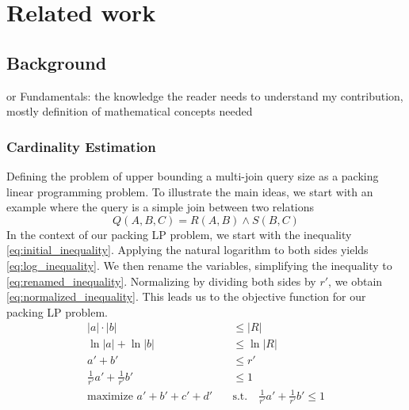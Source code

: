 
\chapter{Related work}\label{chapter:relatedwork}

\section{Background}
or Fundamentals: the knowledge the reader needs to understand my contribution, mostly definition of mathematical concepts needed

\subsection{Cardinality Estimation}
Defining the problem of upper bounding a multi-join query size as a packing linear programming problem.
To illustrate the main ideas, we start with an example where the query is a simple join
between two relations
\[
Q(A, B, C) = R(A, B) \land S(B, C)
\]
In the context of our packing LP problem, we start with the inequality \ref{eq:initial_inequality}. Applying the natural logarithm to both sides yields \ref{eq:log_inequality}. We then rename the variables, simplifying the inequality to \ref{eq:renamed_inequality}. 
Normalizing by dividing both sides by \(r'\), we obtain \ref{eq:normalized_inequality}. This leads us to the objective function for our packing LP problem.
\begin{align}
    |a| \cdot |b| &\leq |R| \label{eq:initial_inequality} \\
    \ln|a| + \ln|b| &\leq \ln|R| \label{eq:log_inequality} \\
    a' + b' &\leq r' \label{eq:renamed_inequality} \\
    \frac{1}{r'} a' + \frac{1}{r'} b' &\leq 1 \label{eq:normalized_inequality} \\
    \text{maximize } a' + b' + c' + d' \quad &\text{s.t.} \quad \frac{1}{r'} a' + \frac{1}{r'} b' \leq 1 \label{eq:objective_function}
    \end{align}



